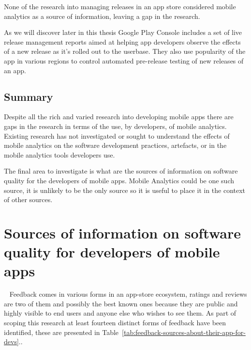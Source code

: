 None of the research into managing releases in an app store considered mobile analytics as a source of information, leaving a gap in the research.

As we will discover later in this thesis Google Play Console includes a set of live release management reports aimed at helping app developers observe the effects of a new release as it's rolled out to the userbase. They also use popularity of the app in various regions to control automated pre-release testing of new releases of an app. %

\subsection{Summary} 
Despite all the rich and varied research into developing mobile apps there are gaps in the research in terms of the use, by developers, of mobile analytics. Existing research has not investigated or sought to understand the effects of mobile analytics on the software development practices, artefacts, or in the mobile analytics tools developers use. 

The final area to investigate is what are the sources of information on software quality for the developers of mobile apps. Mobile Analytics could be one such source, it is unlikely to be the only source so it is useful to place it in the context of other sources.


\section{Sources of information on software quality for developers of mobile apps}~\label{rw-sources-of-info-on-software-quality-for-devs-of-mobile-apps}
Feedback comes in various forms in an app-store ecosystem, ratings and reviews are two of them and possibly the best known ones because they are public and highly visible to end users and anyone else who wishes to see them. As part of scoping this research at least fourteen distinct forms of feedback have been identified, these are presented in Table~\ref{tab:feedback-sources-about-their-app-for-devs}..

